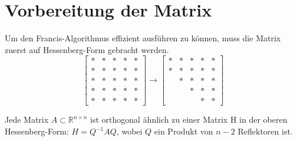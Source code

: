 \section{Vorbereitung der Matrix\label{francis:section:vorbereitung}}
Um den Francis-Algorithmus effizient ausführen zu können, muss die Matrix zuerst auf Hessenberg-Form gebracht werden.
\begin{equation}
	\begin{bmatrix}
	* & * & * & * & * \\
	* & * & * & * & * \\
	*& * & * & * & * \\
	*&  * & * & * & * \\
	*&  * &  * & * & *
	\end{bmatrix} \rightarrow
	\begin{bmatrix}
	* & * & * & * & * \\
	* & * & * & * & * \\
	& * & * & * & * \\
	&   & * & * & * \\
	&   &   & * & *
	\end{bmatrix}
\end{equation}

\begin{satz}
	Jede Matrix $ A \subset \mathbb{R} ^{n \times n} $ ist orthogonal ähnlich zu einer Matrix H in der oberen Hessenberg-Form: $ H=Q^{-1}AQ $, wobei $Q$ ein Produkt von $n-2$ Reflektoren ist.
\end{satz}

